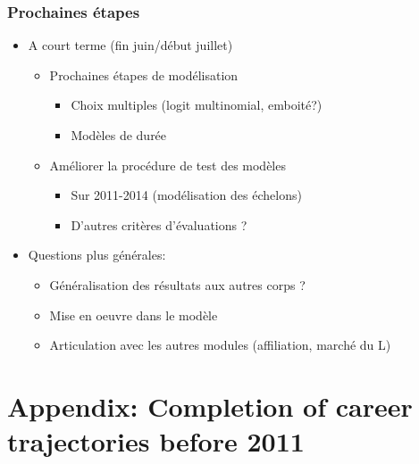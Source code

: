 \documentclass[xcolor=table,ignorenonframetext,12pt]{beamer}
\newenvironment{choixmarges}[2]{\begin{list}{}{%
\setlength{\topsep}{0pt}%
\setlength{\leftmargin}{0pt}%
\setlength{\rightmargin}{0pt}%
\setlength{\listparindent}{\parindent}%
\setlength{\itemindent}{\parindent}%
\setlength{\parsep}{0pt plus 1pt}%
\addtolength{\leftmargin}{#1}%
\addtolength{\rightmargin}{#2}%
}\item }{\end{list}}
\begin{document}
\begin{frame}

\frametitle{Prochaines étapes}

\begin{choixmarges}{-0.5cm}{-0.5cm}

\begin{itemize}

\item A court terme (fin juin/début juillet)

\begin{itemize}

\item Prochaines étapes de modélisation
\begin{itemize}
\item Choix multiples (logit multinomial, emboité?)
\item Modèles de durée
\end{itemize}

\vspace{0.1cm}

\item Améliorer la procédure de test des modèles
\begin{itemize}
\item Sur 2011-2014 (modélisation des échelons)
\item D'autres critères d'évaluations ? 
\end{itemize}

\end{itemize}

\vspace{0.2cm}


\item Questions plus générales:
\begin{itemize}
\item Généralisation des résultats aux autres corps ?
\item Mise en oeuvre dans le modèle
\item Articulation avec les autres modules (affiliation, marché du L)
\end{itemize}

\end{itemize}



\end{choixmarges}
\end{frame}





\section*{Appendix: Completion of career trajectories before 2011}
\end{document}
